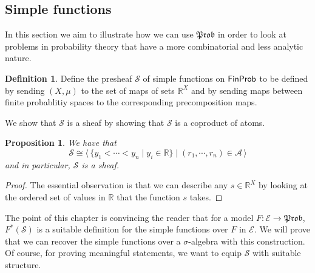 \documentclass[a4paper]{amsproc}
\theoremstyle{plain}
\newtheorem{proposition}[theorem]{Proposition}
\theoremstyle{definition}
\newtheorem{definition}[theorem]{Definition}
\theoremstyle{remark}
\numberwithin{equation}{section}
\newcommand{\FinProb}{\textup{\textsf{FinProb}}}
\newcommand{\Prob}{\mathfrak{Prob}}
\newcommand{\la}{\langle\,}
\newcommand{\ra}{\,\rangle}
\begin{document}
\subsection{Simple functions} \label{simple_functions}

In this section we aim to illustrate how we can use $\Prob$ in order to look at problems in probability theory that have a more combinatorial and less analytic nature.


\begin{definition}
    Define the presheaf $\mathcal{S}$ of simple functions on $\FinProb$ to be defined by sending $(X,\mu)$ to the set of maps of sets $\mathbb{R}^X$ and by sending maps between finite probablitiy spaces to the corresponding precomposition maps.
\end{definition}

We show that $\mathcal{S}$ is a sheaf by showing that $\mathcal{S}$ is a coproduct of atoms.

\begin{proposition}
    We have that
    \[
        \mathcal{S} \cong \la \{y_1 < \cdots < y_n \mid y_i \in \mathbb{R} \} \mid (r_1, \cdots, r_n) \in \mathcal{A} \ra
    \]
    and in particular, $\mathcal{S}$ is a sheaf.
\end{proposition}
\begin{proof}
    The essential observation is that we can describe any $s \in \mathbb{R}^X$ by looking at the ordered set of values in $\mathbb{R}$ that the function $s$ takes.
\end{proof}


The point of this chapter is convincing the reader that for a model $F: \mathcal{E} \to \Prob$, $F^*(\mathcal{S})$ is a suitable definition for the simple functions over $F$ in $\mathcal{E}$. We will prove that we can recover the simple functions over a $\sigma$-algebra with this construction. Of course, for proving meaningful statements, we want to equip $\mathcal{S}$ with suitable structure.
\end{document}
